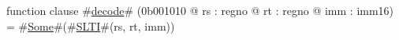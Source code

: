 function clause #\hyperref[zdecode]{decode}# (0b001010 @ rs : regno @ rt : regno @ imm : imm16) =
  #\hyperref[zSome]{Some}#(#\hyperref[zSLTI]{SLTI}#(rs, rt, imm))
